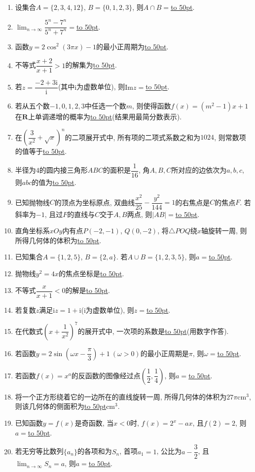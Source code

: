 \documentclass[10pt,a4paper]{article}
\newcommand{\blank}[1]{\underline{\hbox to #1pt{}}}
\begin{document}
\begin{enumerate}[1.]
\item 设集合$A=\{2,3,4,12\}$, $B=\{0,1,2,3\}$, 则$A\cap B=$\blank{50}.
\item $\displaystyle\lim_{n\to\infty}\dfrac{5^n-7^n}{5^n+7^n}=$\blank{50}.
\item 函数$y=2\cos^2(3\pi x)-1$的最小正周期为\blank{50}.
\item 不等式$\dfrac{x+2}{x+1}>1$的解集为\blank{50}.
\item 若$z=\dfrac{-2+3\mathrm{i}}{\mathrm{i}}$(其中$\mathrm{i}$为虚数单位), 则$\mathrm{Im} z=$\blank{50}.
\item 若从五个数$-1,0,1,2,3$中任选一个数$m$, 则使得函数$f(x)=(m^2-1)x+1$在$\mathbf{R}$上单调递增的概率为\blank{50}(结果用最简分数表示).
\item 在$(\dfrac3{x^2}+\sqrt{x})^n$的二项展开式中, 所有项的二项式系数之和为$1024$, 则常数项的值等于\blank{50}.
\item 半径为$4$的圆内接三角形$ABC$的面积是$\dfrac1{16}$, 角$A,B,C$所对应的边依次为$a,b,c$, 则$abc$的值为\blank{50}.
\item 已知抛物线$C$的顶点为坐标原点, 双曲线$\dfrac{x^2}{25}-\dfrac{y^2}{144}=1$的右焦点是$C$的焦点$F$. 若斜率为$-1$, 且过$F$的直线与$C$交于$A,B$两点, 则$|AB|=$\blank{50}.
\item 直角坐标系$xOy$内有点$P(-2,-1)$, $Q(0,-2)$, 将$\triangle POQ$绕$x$轴旋转一周, 则所得几何体的体积为\blank{50}.


\item 已知集合$A=\{1,2,5\}$, $B=\{2,a\}$. 若$A\cup B=\{1,2,3,5\}$, 则$a=$\blank{50}.
\item 抛物线$y^2=4x$的焦点坐标是\blank{50}.
\item 不等式$\dfrac x{x+1}<0$的解是\blank{50}.
\item 若复数$z$满足$\mathrm{i}z=1+\mathrm{i}$($\mathrm{i}$为虚数单位), 则$z=$\blank{50}.
\item 在代数式$(x+\dfrac 1{x^2})^7$的展开式中, 一次项的系数是\blank{50}(用数字作答).
\item 若函数$y=2\sin (\omega x-\dfrac\pi 3)+1 \ (\omega >0)$的最小正周期是$\pi$, 则$\omega=$\blank{50}.
\item 若函数$f(x)=x^a$的反函数的图像经过点$(\dfrac12,\dfrac14)$, 则$a=$\blank{50}.
\item 将一个正方形绕着它的一边所在的直线旋转一周, 所得几何体的体积为$27\pi\text{cm}^3$, 则该几何体的侧面积为\blank{50}$\text{cm}^3$.
\item 已知函数$y=f(x)$是奇函数, 当$x<0$时, $f(x)=2^x-ax$, 且$f(2)=2$, 则$a=$\blank{50}.
\item 若无穷等比数列$\{a_n\}$的各项和为$S_n$, 首项$a_1=1$, 公比为$a-\dfrac32$, 且$\displaystyle\lim_{n\to\infty}S_n=a$, 则$a=$\blank{50}.


\end{enumerate}
\end{document}
